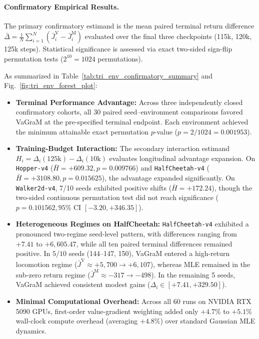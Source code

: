 \documentclass[journal,10pt,twocolumn]{IEEEtran}
\begin{document}
\paragraph{Confirmatory Empirical Results.}
The primary confirmatory estimand is the mean paired terminal return difference $\bar{\Delta} = \frac{1}{N}\sum_{i=1}^N (\bar{J}_i^{\mathrm{V}} - \bar{J}_i^{\mathrm{M}})$ evaluated over the final three checkpoints (115k, 120k, 125k steps). Statistical significance is assessed via exact two-sided sign-flip permutation tests ($2^{10} = 1024$ permutations).

As summarized in Table~\ref{tab:tri_env_confirmatory_summary} and Fig.~\ref{fig:tri_env_forest_plot}:
\begin{itemize}
    \item \textbf{Terminal Performance Advantage:} Across three independently closed confirmatory cohorts, all 30 paired seed--environment comparisons favored VaGraM at the pre-specified terminal endpoint. Each environment achieved the minimum attainable exact permutation $p$-value ($p = 2/1024 = 0.001953$).
    \item \textbf{Training-Budget Interaction:} The secondary interaction estimand $H_i = \Delta_i(125\mathrm{k}) - \Delta_i(10\mathrm{k})$ evaluates longitudinal advantage expansion. On \texttt{Hopper-v4} ($\bar{H} = +609.32, p = 0.009766$) and \texttt{HalfCheetah-v4} ($\bar{H} = +3108.80, p = 0.015625$), the advantage expanded significantly. On \texttt{Walker2d-v4}, 7/10 seeds exhibited positive shifts ($\bar{H} = +172.24$), though the two-sided continuous permutation test did not reach significance ($p = 0.101562, 95\%\text{ CI } [-3.20, +346.35]$).
    \item \textbf{Heterogeneous Regimes on HalfCheetah:} \texttt{HalfCheetah-v4} exhibited a pronounced two-regime seed-level pattern, with differences ranging from $+7.41$ to $+6,605.47$, while all ten paired terminal differences remained positive. In $5/10$ seeds (144--147, 150), VaGraM entered a high-return locomotion regime ($\bar{J}^{\mathrm{V}} \approx +5,700 \to +6,107$), whereas MLE remained in the sub-zero return regime ($\bar{J}^{\mathrm{M}} \approx -317 \to -498$). In the remaining 5 seeds, VaGraM achieved consistent modest gains ($\Delta_i \in [+7.41, +329.50]$).
    \item \textbf{Minimal Computational Overhead:} Across all 60 runs on NVIDIA RTX 5090 GPUs, first-order value-gradient weighting added only $+4.7\%$ to $+5.1\%$ wall-clock compute overhead (averaging $+4.8\%$) over standard Gaussian MLE dynamics.
\end{itemize}
\end{document}
